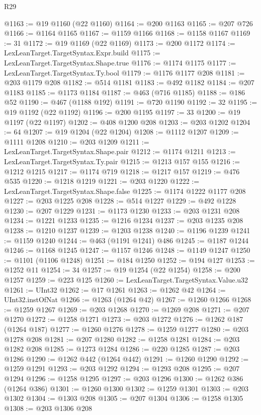 \begin{lexlean}{R29}
\begin{coremodule}
@1163 := @19 @1160 (@22 @1160)
@1164 := @200 @1163
@1165 := @207 @726
@1166 := @1164 @1165
@1167 := @1159 @1166
@1168 := @1158 @1167
@1169 := 31
@1172 := @19 @1169 (@22 @1169)
@1173 := @200 @1172
@1174 := LexLeanTarget.TargetSyntax.Expr.build
@1175 := LexLeanTarget.TargetSyntax.Shape.true
@1176 := @1174 @1175
@1177 := LexLeanTarget.TargetSyntax.Ty.bool
@1179 := @1176 @1177 @208
@1181 := @203 @1179 @208
@1182 := @514 @1181
@1183 := @492 @1182
@1184 := @207 @1183
@1185 := @1173 @1184
@1187 := @463 (@716 @1185)
@1188 := @186 @52
@1190 := @467 (@1188 @192)
@1191 := @720 @1190
@1192 := 32
@1195 := @19 @1192 (@22 @1192)
@1196 := @200 @1195
@1197 := 33
@1200 := @19 @1197 (@22 @1197)
@1202 := @408 @1200 @208
@1203 := @203 @1202
@1204 := 64
@1207 := @19 @1204 (@22 @1204)
@1208 := @1112 @1207
@1209 := @1111 @1208
@1210 := @203 @1209
@1211 := LexLeanTarget.TargetSyntax.Shape.pair
@1212 := @1174 @1211
@1213 := LexLeanTarget.TargetSyntax.Ty.pair
@1215 := @1213 @157 @155
@1216 := @1212 @1215
@1217 := @1174 @719
@1218 := @1217 @157
@1219 := @476 @535
@1220 := @1218 @1219
@1221 := @203 @1220
@1222 := LexLeanTarget.TargetSyntax.Shape.false
@1225 := @1174 @1222 @1177 @208
@1227 := @203 @1225 @208
@1228 := @514 @1227
@1229 := @492 @1228
@1230 := @207 @1229
@1231 := @1173 @1230
@1233 := @203 @1231 @208
@1234 := @1221 @1233
@1235 := @1216 @1234
@1237 := @203 @1235 @208
@1238 := @1210 @1237
@1239 := @1203 @1238
@1240 := @1196 @1239
@1241 := @1159 @1240
@1244 := @463 (@1191 @1241) @486
@1245 := @1187 @1244
@1246 := @1168 @1245
@1247 := @1157 @1246
@1248 := @1149 @1247
@1250 := @1101 (@1106 @1248)
@1251 := @184 @1250
@1252 := @194 @127
@1253 := @1252 @11
@1254 := 34
@1257 := @19 @1254 (@22 @1254)
@1258 := @200 @1257
@1259 := @223 @125
@1260 := LexLeanTarget.TargetSyntax.Value.u32
@1261 := UInt32
@1262 := @17 @1261
@1263 := @1262 @42
@1264 := UInt32.instOfNat
@1266 := @1263 (@1264 @42)
@1267 := @1260 @1266
@1268 := @1259 @1267
@1269 := @203 @1268
@1270 := @1269 @208
@1271 := @207 @1270
@1272 := @1258 @1271
@1273 := @203 @1272
@1276 := @1262 @187 (@1264 @187)
@1277 := @1260 @1276
@1278 := @1259 @1277
@1280 := @203 @1278 @208
@1281 := @207 @1280
@1282 := @1258 @1281
@1284 := @203 @1282 @208
@1285 := @1273 @1284
@1286 := @220 @1285
@1287 := @203 @1286
@1290 := @1262 @442 (@1264 @442)
@1291 := @1260 @1290
@1292 := @1259 @1291
@1293 := @203 @1292
@1294 := @1293 @208
@1295 := @207 @1294
@1296 := @1258 @1295
@1297 := @203 @1296
@1300 := @1262 @386 (@1264 @386)
@1301 := @1260 @1300
@1302 := @1259 @1301
@1303 := @203 @1302
@1304 := @1303 @208
@1305 := @207 @1304
@1306 := @1258 @1305
@1308 := @203 @1306 @208

\end{coremodule}
\end{lexlean}
